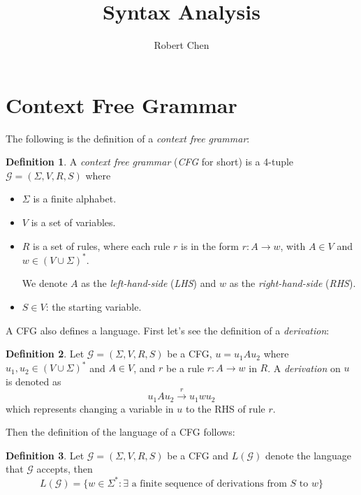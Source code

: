 \documentclass[titlepage]{article}
\title{Syntax Analysis}
\author{Robert Chen}
\theoremstyle{plain}
\theoremstyle{definition}
\newtheorem*{definition}{Definition}
\theoremstyle{remark}
\begin{document}
\maketitle

\newpage
\tableofcontents

\newpage
\section{Context Free Grammar}
The following is the definition of a \textit{context free grammar}:
\begin{definition}
  A \textit{context free grammar} (\textit{CFG} for short) is a 4-tuple
  $\mathcal{G}=(\Sigma,V,R,S)$ where
  \begin{itemize}
    \item $\Sigma$ is a finite alphabet.
    \item $V$ is a set of variables.
    \item $R$ is a set of rules, where each rule $r$ is in the form $r: A
      \rightarrow w$, with $A\in V$ and $w\in {(V\cup\Sigma)}^*$.

      We denote $A$ as the \textit{left-hand-side} (\textit{LHS}) and $w$ as the
      \textit{right-hand-side} (\textit{RHS}).
    \item $S\in V$: the starting variable.
  \end{itemize}
\end{definition}
A CFG also defines a language. First let's see the definition of a
\textit{derivation}:
\begin{definition}
  Let $\mathcal{G}=(\Sigma,V,R,S)$ be a CFG, $u=u_1Au_2$ where
  $u_1,u_2\in{(V\cup\Sigma)}^*$ and $A\in V$, and $r$ be a rule
  $r: A\rightarrow w$ in $R$. A \textit{derivation} on $u$ is denoted as
  \[
    u_1Au_2\xrightarrow{r}u_1wu_2
  \]
  which represents changing a variable in $u$ to the RHS of rule $r$.
\end{definition}
Then the definition of the language of a CFG follows:
\begin{definition}
  Let $\mathcal{G}=(\Sigma,V,R,S)$ be a CFG and $L(\mathcal{G})$ denote the
  language that $\mathcal{G}$ accepts, then
  \[
    L(\mathcal{G})=\{w\in\Sigma^*:\exists\text{ a finite sequence of derivations
    from }S\text{ to }w\}
  \]
\end{definition}
\end{document}
